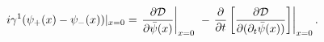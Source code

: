 \begin{equation}
i\gamma ^{1}(\psi _{+}(x)-\psi _{-}(x))|_{x=0}=\left. \frac{\partial 
\mathcal{D}}{\partial \bar{\psi}(x)}\right\vert _{x=0}\,\,-\left. \frac{%
\partial }{\partial t}\left[ \frac{\partial \mathcal{D}}{\partial (\partial
_{t}\bar{\psi}(x))}\right] \right\vert _{x=0}.  \label{bbcon}
\end{equation}

